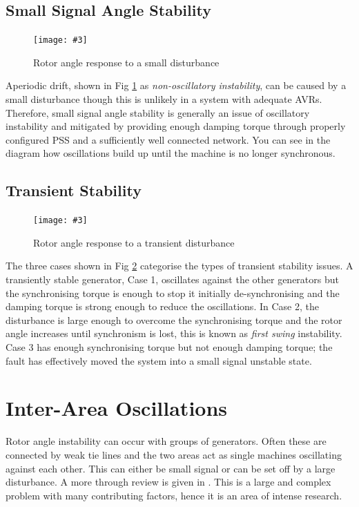 \documentclass[a4paper,oneside,12pt]{report}
\newcommand{\image}[3] {
  \begin{figure}
    \begin{center}
      \texttt{[image: \#3]}
      \caption{#2}
      \label{#1}
    \end{center}
  \end{figure}
}
\begin{document}
\subsection{Small Signal Angle Stability}

\image{rotorsmallstability}{Rotor angle response to a small disturbance \cite{Kundur1994}}{rotorsmallstability.png}

Aperiodic drift, shown in Fig \ref{rotorsmallstability} as \emph{non-oscillatory instability}, can be caused by a small disturbance though this is unlikely in a system with adequate AVRs. Therefore, small signal angle stability is generally an issue of oscillatory instability and mitigated by providing enough damping torque through properly configured PSS and a sufficiently well connected network. You can see in the diagram how oscillations build up until the machine is no longer synchronous.

\subsection{Transient Stability}

\image{rotorlargestability}{Rotor angle response to a transient disturbance \cite{Kundur1994}}{rotorlargestability.png}

The three cases shown in Fig \ref{rotorlargestability} categorise the types of transient stability issues. A transiently stable generator, Case 1, oscillates against the other generators but the synchronising torque is enough to stop it initially de-synchronising and the damping torque is strong enough to reduce the oscillations. In Case 2, the disturbance is large enough to overcome the synchronising torque and the rotor angle increases until synchronism is lost, this is known as \emph{first swing} instability. Case 3 has enough synchronising torque but not enough damping torque; the fault has effectively moved the system into a small signal unstable state.

\section{Inter-Area Oscillations}

Rotor angle instability can occur with groups of generators. Often these are connected by weak tie lines and the two areas act as single machines oscillating against each other. This can either be small signal or can be set off by a large disturbance. A more through review is given in \cite{Klein2002}. This is a large and complex problem with many contributing factors, hence it is an area of intense research.
\end{document}

